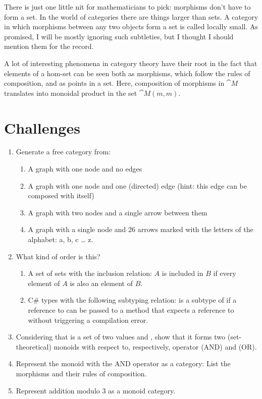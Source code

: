 \noindent
There is just one little nit for mathematicians to pick: morphisms don't
have to form a set. In the world of categories there are things larger
than sets. A category in which morphisms between any two objects form a
set is called locally small. As promised, I will be mostly ignoring such
subtleties, but I thought I should mention them for the record.

A lot of interesting phenomena in category theory have their root in the
fact that elements of a hom-set can be seen both as morphisms, which
follow the rules of composition, and as points in a set. Here,
composition of morphisms in $\cat{M}$ translates into monoidal product in the
set $\cat{M}(m, m)$.

\section{Challenges}

\begin{enumerate}
  \tightlist
  \item
        Generate a free category from:

        \begin{enumerate}
          \tightlist
          \item
                A graph with one node and no edges
          \item
                A graph with one node and one (directed) edge (hint: this edge can
                be composed with itself)
          \item
                A graph with two nodes and a single arrow between them
          \item
                A graph with a single node and 26 arrows marked with the letters of
                the alphabet: a, b, c \ldots{} z.
        \end{enumerate}
  \item
        What kind of order is this?

        \begin{enumerate}
          \tightlist
          \item
                A set of sets with the inclusion relation: $A$ is included in $B$ if
                every element of $A$ is also an element of $B$.
          \item
                C\# types with the following subtyping relation:  is a subtype of
                 if a reference to  can be passed to a method that expects a
                reference to  without triggering a compilation error.
        \end{enumerate}
  \item
        Considering that  is a set of two values  and , show that
        it forms two (set-theoretical) monoids with respect to, respectively,
        operator \code{\&\&} (AND) and \code{||} (OR).
  \item
        Represent the  monoid with the AND operator as a category: List
        the morphisms and their rules of composition.
  \item
        Represent addition modulo 3 as a monoid category.
\end{enumerate}